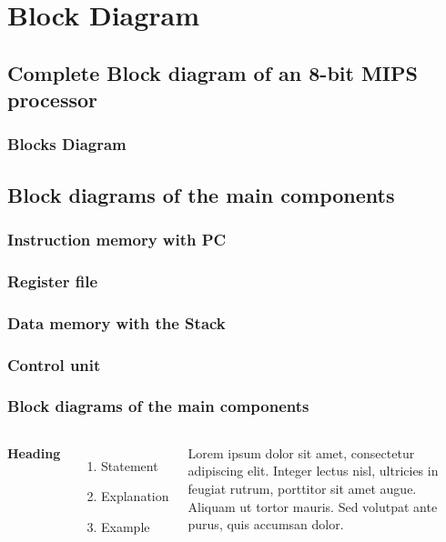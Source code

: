\documentclass[8pt, light]{oist_presentation}
\begin{document}
\section{Block Diagram}
\subsection{Complete Block diagram of an 8-bit MIPS processor}
\begin{frame}
\frametitle{Blocks Diagram}

\end{frame}


\subsection{Block diagrams of the main components}
\subsubsection{Instruction memory with PC}
\subsubsection{Register file}
\subsubsection{Data memory with the Stack}
\subsubsection{Control unit}
\begin{frame}
\frametitle{Block diagrams of the main components}
\begin{columns}[c]

\textbf{Heading}
\begin{enumerate}
\item Statement
\item Explanation
\item Example
\end{enumerate}

Lorem ipsum dolor sit amet, consectetur adipiscing elit. Integer lectus nisl, ultricies in feugiat rutrum, porttitor sit amet augue. Aliquam ut tortor mauris. Sed volutpat ante purus, quis accumsan dolor.

\end{columns}
\end{frame}
\end{document}
